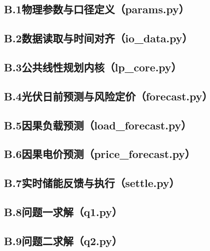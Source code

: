 \subsection*{B.1\quad 物理参数与口径定义（params.py）}


\subsection*{B.2\quad 数据读取与时间对齐（io\_data.py）}


\subsection*{B.3\quad 公共线性规划内核（lp\_core.py）}


\subsection*{B.4\quad 光伏日前预测与风险定价（forecast.py）}


\subsection*{B.5\quad 因果负载预测（load\_forecast.py）}


\subsection*{B.6\quad 因果电价预测（price\_forecast.py）}


\subsection*{B.7\quad 实时储能反馈与执行（settle.py）}


\subsection*{B.8\quad 问题一求解（q1.py）}


\subsection*{B.9\quad 问题二求解（q2.py）}


